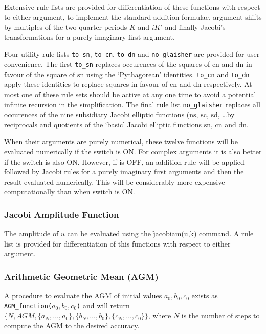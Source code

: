 Extensive rule lists are provided for differentiation of these functions with
respect to either argument, to implement the standard addition formulae,
argument shifts by multiples of the two quarter-periods $K$ and $iK'$ and
finally Jacobi's transformations for a purely imaginary first argument.

Four utility rule lists \texttt{to\_sn}, \texttt{to\_cn}, \texttt{to\_dn} and
\texttt{no\_glaisher} are provided for user convenience. The first
\texttt{to\_sn} replaces occurences of the squares of $\mathrm{cn}$ and
$\mathrm{dn}$ in favour of the square of $\mathrm{sn}$ using the
`Pythagorean' identities. \texttt{to\_cn} and \texttt{to\_dn} apply these
identities to replace squares in favour of $\mathrm{cn}$ and $\mathrm{dn}$
respectively. At most one of these rule sets should be active at any one time
to avoid a potential infinite recursion in the simplification.
The final rule list \texttt{no\_glaisher} replaces all occurences of the
nine subsidiary Jacobi elliptic functions ($\mathrm{ns}$, $\mathrm{sc}$,
$\mathrm{sd}$, \ldots by reciprocals and quotients of the `basic' Jacobi
elliptic functions $\mathrm{sn}$, $\mathrm{cn}$ and $\mathrm{dn}$.

When their arguments are purely numerical, these twelve functions will be
evaluated numerically if the  switch is ON. For
complex arguments it is also better if the  switch is also ON.
However, if  is OFF, an addition rule will be applied followed by
Jacobi rules for a purely imaginary first arguments and then the result
evaluated numerically. This will be considerably more expensive computationally
than when switch  is ON.

\subsubsection{Jacobi Amplitude Function}
\hypertarget{operator:JACOBIAM}{}
The amplitude of $u$ can be evaluated using the \f{jacobiam(u,k)}
command.  A rule list is provided for differentiation of this
functions with respect to either argument.

\subsubsection{Arithmetic Geometric Mean (AGM)}
A procedure to evaluate the AGM of initial values \(a_0,b_0,c_0\)
exists as \\
\texttt{AGM\_function(\(a_0,b_0,c_0\))} and will return \\
$\{ N, AGM, \{ a_N, \ldots ,a_0\}, \{ b_N, \ldots ,b_0\},
\{c_N, \ldots ,c_0\}\}$,
where $N$ is the number of steps to compute the AGM to the
desired accuracy.

